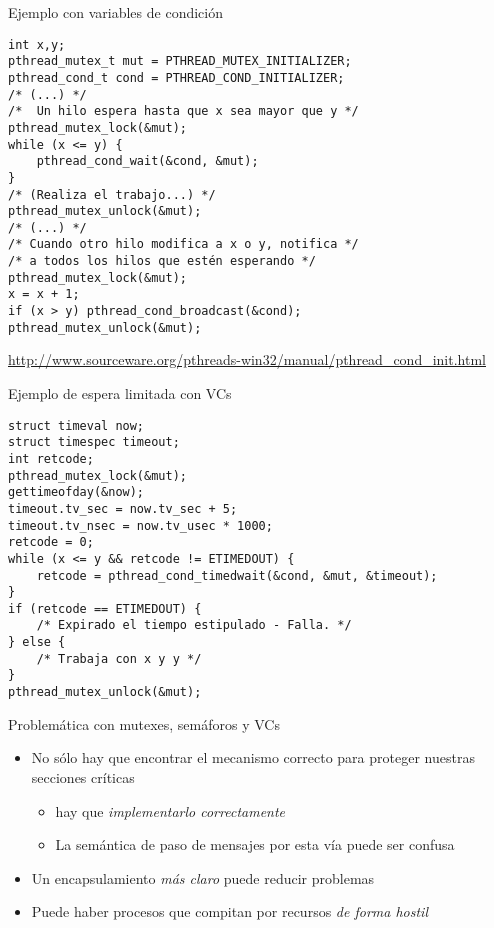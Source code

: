 \documentclass[presentation]{beamer}
\begin{document}
\begin{frame}[label={sec:org720ee3a},fragile]{Ejemplo con variables de condición}
 \begin{verbatim}
int x,y;
pthread_mutex_t mut = PTHREAD_MUTEX_INITIALIZER;
pthread_cond_t cond = PTHREAD_COND_INITIALIZER;
/* (...) */
/*  Un hilo espera hasta que x sea mayor que y */
pthread_mutex_lock(&mut);
while (x <= y) {
	pthread_cond_wait(&cond, &mut);
}
/* (Realiza el trabajo...) */
pthread_mutex_unlock(&mut);
/* (...) */
/* Cuando otro hilo modifica a x o y, notifica */
/* a todos los hilos que estén esperando */
pthread_mutex_lock(&mut);
x = x + 1;
if (x > y) pthread_cond_broadcast(&cond);
pthread_mutex_unlock(&mut);
\end{verbatim}
{\scriptsize
\url{http://www.sourceware.org/pthreads-win32/manual/pthread\_cond\_init.html}
}
\end{frame}

\begin{frame}[label={sec:org6b630d5},fragile]{Ejemplo de espera limitada con VCs}
 \begin{verbatim}
struct timeval now;
struct timespec timeout;
int retcode;
pthread_mutex_lock(&mut);
gettimeofday(&now);
timeout.tv_sec = now.tv_sec + 5;
timeout.tv_nsec = now.tv_usec * 1000;
retcode = 0;
while (x <= y && retcode != ETIMEDOUT) {
	retcode = pthread_cond_timedwait(&cond, &mut, &timeout);
}
if (retcode == ETIMEDOUT) {
	/* Expirado el tiempo estipulado - Falla. */
} else {
	/* Trabaja con x y y */
}
pthread_mutex_unlock(&mut);

\end{verbatim}
\end{frame}

\begin{frame}[label={sec:orgc5bc5ac}]{Problemática con mutexes, semáforos y VCs}
\begin{itemize}
\item No sólo hay que encontrar el mecanismo correcto para proteger
nuestras secciones críticas
\begin{itemize}
\item hay que \emph{implementarlo correctamente}
\item La semántica de paso de mensajes por esta vía puede ser confusa
\end{itemize}
\item Un encapsulamiento \emph{más claro} puede reducir problemas
\item Puede haber procesos que compitan por recursos \emph{de forma hostil}
\end{itemize}
\end{frame}
\end{document}
